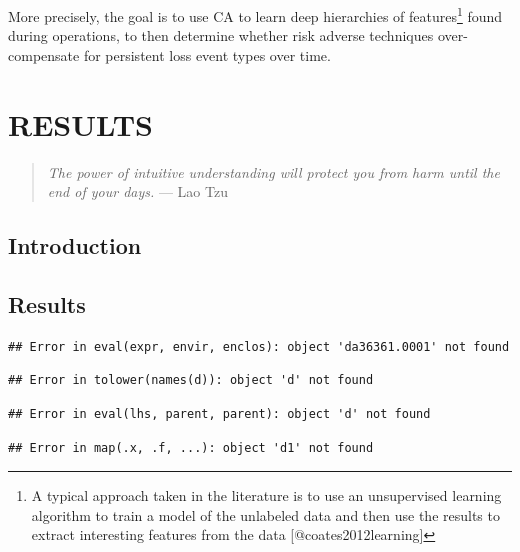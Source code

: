 \documentclass[]{DissertateUSU}
\let\rmarkdownfootnote\footnote%
\def\footnote{\protect\rmarkdownfootnote}
\begin{document}
More precisely, the goal is to use CA to learn deep hierarchies of
features\footnote{A typical approach taken in the literature is to use an unsupervised learning algorithm to train a model of the unlabeled data and then use the results to extract interesting features from the data [@coates2012learning]}
found during operations, to then determine whether risk adverse
techniques over-compensate for persistent loss event types over time.

\singlespacing

\FloatBarrier

\newpage

 \fancyhead[R]{\thepage} \fancyfoot[C]{}

\chapter{RESULTS}

\begin{quote}
\emph{The power of intuitive understanding will protect you from harm until the end of your days.}
--- Lao Tzu
\end{quote}

\doublespacing

\section{Introduction}\label{introduction-1}

\section{Results}\label{results-1}

\begin{verbatim}
## Error in eval(expr, envir, enclos): object 'da36361.0001' not found
\end{verbatim}

\begin{verbatim}
## Error in tolower(names(d)): object 'd' not found
\end{verbatim}

\begin{verbatim}
## Error in eval(lhs, parent, parent): object 'd' not found
\end{verbatim}

\begin{verbatim}
## Error in map(.x, .f, ...): object 'd1' not found
\end{verbatim}
\end{document}
